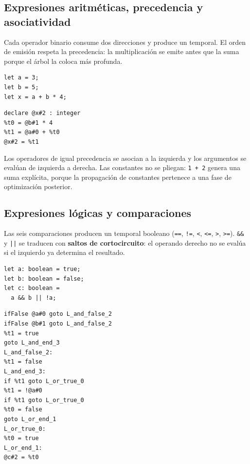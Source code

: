 \documentclass[11pt,a4paper]{article}
\begin{document}
\subsection{Expresiones aritméticas, precedencia y asociatividad}

Cada operador binario consume dos direcciones y produce un temporal. El orden de
emisión respeta la precedencia: la multiplicación se emite antes que la suma
porque el árbol la coloca más profunda.

\noindent
\begin{minipage}[t]{0.40\textwidth}
\begin{lstlisting}[language=Compiscript,style=sinnumero]
let a = 3;
let b = 5;
let x = a + b * 4;
\end{lstlisting}
\end{minipage}\hfill
\begin{minipage}[t]{0.54\textwidth}
\begin{lstlisting}[language=TAC,style=sinnumero]
declare @x#2 : integer
%t0 = @b#1 * 4
%t1 = @a#0 + %t0
@x#2 = %t1
\end{lstlisting}
\end{minipage}

Los operadores de igual precedencia se asocian a la izquierda y los argumentos
se evalúan de izquierda a derecha. Las constantes no se pliegan: \texttt{1 + 2}
genera una suma explícita, porque la propagación de constantes pertenece a una
fase de optimización posterior.

\subsection{Expresiones lógicas y comparaciones}

Las seis comparaciones producen un temporal booleano (\texttt{==}, \texttt{!=},
\texttt{<}, \texttt{<=}, \texttt{>}, \texttt{>=}). \texttt{\&\&} y \texttt{||}
se traducen con \textbf{saltos de cortocircuito}: el operando derecho no se
evalúa si el izquierdo ya determina el resultado.

\noindent
\begin{minipage}[t]{0.36\textwidth}
\begin{lstlisting}[language=Compiscript,style=sinnumero]
let a: boolean = true;
let b: boolean = false;
let c: boolean =
  a && b || !a;
\end{lstlisting}
\end{minipage}\hfill
\begin{minipage}[t]{0.58\textwidth}
\begin{lstlisting}[language=TAC,style=sinnumero]
ifFalse @a#0 goto L_and_false_2
ifFalse @b#1 goto L_and_false_2
%t1 = true
goto L_and_end_3
L_and_false_2:
%t1 = false
L_and_end_3:
if %t1 goto L_or_true_0
%t1 = !@a#0
if %t1 goto L_or_true_0
%t0 = false
goto L_or_end_1
L_or_true_0:
%t0 = true
L_or_end_1:
@c#2 = %t0
\end{lstlisting}
\end{minipage}
\end{document}
